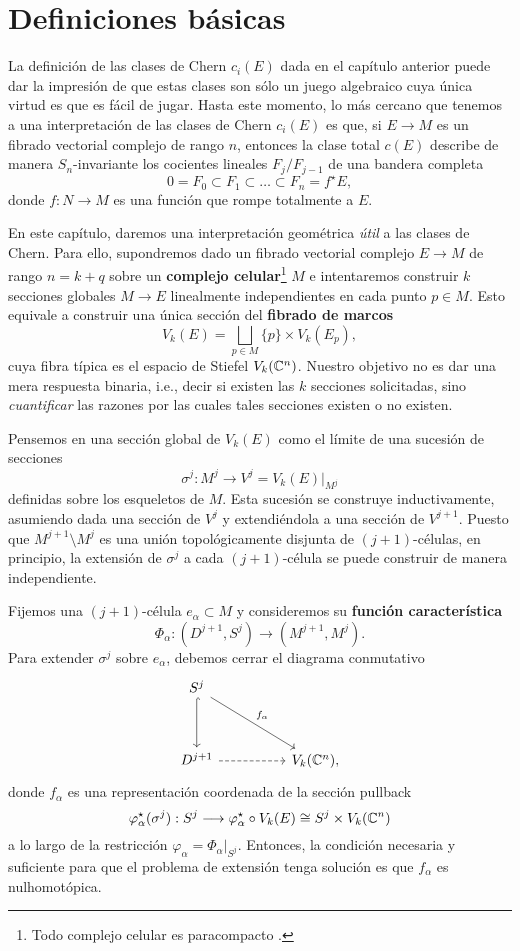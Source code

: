 \section{Definiciones básicas}

La definición de las clases de Chern $c_i(E)$ dada en el capítulo anterior puede dar la impresión de que estas clases son sólo un juego algebraico cuya única virtud es que es fácil de jugar. Hasta este momento, lo más cercano que tenemos a una interpretación de las clases de Chern $c_i(E)$ es que, si $E \to M$ es un fibrado vectorial complejo de rango $n$, entonces la clase total $c(E)$ describe de manera $S_n$-invariante los cocientes lineales $F_j / F_{j-1}$ de una bandera completa
$$0 = F_0 \subset F_1 \subset \dots \subset F_n = f^\star E,$$
donde $f : N \to M$ es una función que rompe totalmente a $E$.

En este capítulo, daremos una interpretación geométrica \textit{útil} a las clases de Chern. Para ello, supondremos dado un fibrado vectorial complejo $E \to M$ de rango $n = k+q$ sobre un \textbf{complejo celular}\footnote{Todo complejo celular es paracompacto \cite[pp. 36-37]{hatcher2}.} $M$ e intentaremos construir $k$ secciones globales $M \to E$ linealmente independientes en cada punto $p \in M$. Esto equivale a construir una única sección del \textbf{fibrado de marcos}
$$V_k(E) = \bigsqcup_{p \in M} \{ p \} \times V_k(E_p),$$
cuya fibra típica es el espacio de Stiefel $V_k(\mathbb C^n)$. Nuestro objetivo no es dar una  mera respuesta binaria, i.e., decir si existen las $k$ secciones solicitadas, sino \textit{cuantificar} las razones por las cuales tales secciones existen o no existen.

Pensemos en una sección global de $V_k(E)$ como el límite de una sucesión de secciones
$$\sigma^j : M^j \longrightarrow V^j = V_k(E) \Big \vert_{M^j}$$
definidas sobre los esqueletos de $M$. Esta sucesión se construye inductivamente, asumiendo dada una sección de $V^j$ y extendiéndola a una sección de $V^{j+1}$. Puesto que $M^{j+1} \setminus M^j$ es una unión topológicamente disjunta de $(j+1)$-células, en principio, la extensión de $\sigma^j$ a cada $(j+1)$-célula se puede construir de manera independiente.

Fijemos una $(j+1)$-célula $e_\alpha \subset M$ y consideremos su \textbf{función característica}
$$\Phi_\alpha : (D^{j+1}, S^j) \longrightarrow (M^{j+1}, M^j).$$
Para extender $\sigma^j$ sobre $e_\alpha$, debemos cerrar el diagrama conmutativo
$$
\begin{tikzcd}[row sep = huge, column sep = huge]
    S^j \arrow[d, hook] \arrow[rd, "f_\alpha"] \\
    D^{j+1} \arrow[r, dashed] & V_k(\C^n),
\end{tikzcd}
$$
donde $f_\alpha$ es una representación coordenada de la sección pullback
$$\varphi_\alpha^\star(\sigma^j) : S^j \longrightarrow \varphi_\alpha^\star \circ V_k(E) \cong S^j \times V_k(\mathbb C^n)$$
a lo largo de la restricción $\varphi_\alpha = \Phi_\alpha \big \vert_{S^j}$. Entonces, la condición necesaria y suficiente para que el problema de extensión tenga solución es que $f_\alpha$ es nulhomotópica.

